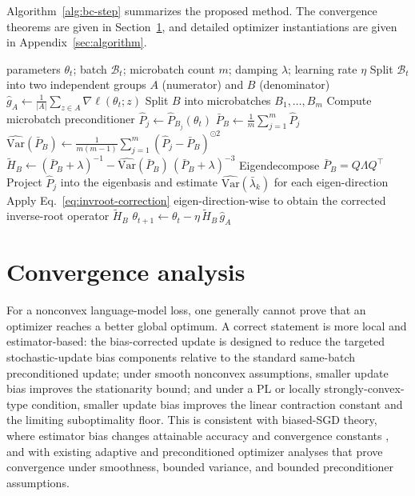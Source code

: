 \documentclass{article}
\newcommand{\Var}{\mathrm{Var}}
\begin{document}
Algorithm~\ref{alg:bc-step} summarizes the proposed method. The convergence theorems are given in Section~\ref{sec:convergence}, and detailed optimizer instantiations are given in Appendix~\ref{sec:algorithm}.

\begin{algorithm}[t]
\caption{Bias-corrected preconditioned step at parameters $\theta_t$.}
\label{alg:bc-step}
\begin{algorithmic}[1]
\Require parameters $\theta_t$; batch $\mathcal{B}_t$; microbatch count $m$; damping $\lambda$; learning rate $\eta$
\State Split $\mathcal{B}_t$ into two independent groups $A$ (numerator) and $B$ (denominator)
\State $\hat g_A \gets \frac{1}{|A|}\sum_{z\in A}\nabla\ell(\theta_t;z)$ 
\State Split $B$ into microbatches $B_1,\ldots,B_m$
    \State Compute microbatch preconditioner $\hat P_j \gets \hat P_{B_j}(\theta_t)$
\EndFor
\State $\bar P_B \gets \frac{1}{m}\sum_{j=1}^m \hat P_j$ 
    \State $\widehat{\Var}(\bar P_B) \gets \frac{1}{m(m-1)}\sum_{j=1}^m (\hat P_j - \bar P_B)^{\odot 2}$
    \State $\widetilde H_B \gets (\bar P_B+\lambda)^{-1} - \widehat{\Var}(\bar P_B)\,(\bar P_B+\lambda)^{-3}$ 
\Else {}
    \State Eigendecompose $\bar P_B = Q\Lambda Q^\top$
    \State Project $\hat P_j$ into the eigenbasis and estimate $\widehat{\Var}(\bar\lambda_k)$ for each eigen-direction
    \State Apply Eq.~\eqref{eq:invroot-correction} eigen-direction-wise to obtain the corrected inverse-root operator $\widetilde H_B$
\EndIf
\State $\theta_{t+1} \gets \theta_t - \eta\, \widetilde H_B\,\hat g_A$
\end{algorithmic}
\end{algorithm}

\section{Convergence analysis}
\label{sec:convergence}

For a nonconvex language-model loss, one generally cannot prove that an optimizer reaches a better global optimum. A correct statement is more local and estimator-based: the bias-corrected update is designed to reduce the targeted stochastic-update bias components relative to the standard same-batch preconditioned update; under smooth nonconvex assumptions, smaller update bias improves the stationarity bound; and under a PL or locally strongly-convex-type condition, smaller update bias improves the linear contraction constant and the limiting suboptimality floor. This is consistent with biased-SGD theory, where estimator bias changes attainable accuracy and convergence constants \citep{ajalloeian2020convergence}, and with existing adaptive and preconditioned optimizer analyses that prove convergence under smoothness, bounded variance, and bounded preconditioner assumptions.
\end{document}
